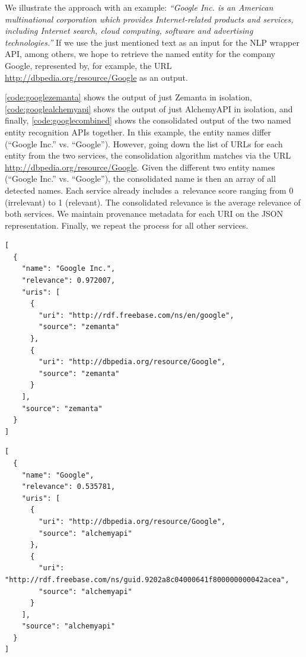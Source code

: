 We illustrate the approach with an example:
\textit{``Google Inc. is an American multinational corporation
which provides Internet-related products and services,
including Internet search, cloud computing, software and 
advertising technologies.''}
If we use the just mentioned text
as an input for the NLP wrapper API,
among others, we hope to retrieve the named entity for the
company Google, represented by, for example, the URL
\url{http://dbpedia.org/resource/Google} as an output.

\autoref{code:googlezemanta} shows the output
of just Zemanta in isolation,
\autoref{code:googlealchemyapi} shows the output
of just AlchemyAPI in isolation,
and finally, \autoref{code:googlecombined} shows the consolidated
output of the two named entity recognition APIs together. 
In this example, the entity names differ (``Google Inc.''
vs. ``Google''). However, going down the list of URLs for
each entity from the two services, the consolidation algorithm
matches via the URL \url{http://dbpedia.org/resource/Google}.
Given the different two entity names (``Google Inc.'' vs.
``Google''), the consolidated name is then an array of all
detected names.
Each service already includes a~relevance score ranging from
0 (irrelevant) to 1 (relevant).
The consolidated relevance is the
average relevance of both services.
We maintain provenance metadata for each URI
on the JSON representation.
Finally, we repeat the process for all other services.

\newpage

\begin{lstlisting}[caption={Output of Zemanta in isolation.},
  label={code:googlezemanta}]
[
  {
    "name": "Google Inc.",
    "relevance": 0.972007,
    "uris": [
      {
        "uri": "http://rdf.freebase.com/ns/en/google",
        "source": "zemanta"
      },
      {
        "uri": "http://dbpedia.org/resource/Google",
        "source": "zemanta"
      }
    ],
    "source": "zemanta"
  }
]
\end{lstlisting}

\begin{lstlisting}[caption={Output of AlchemyAPI in isolation.},
  label={code:googlealchemyapi}]
[
  {
    "name": "Google",
    "relevance": 0.535781,
    "uris": [
      {
        "uri": "http://dbpedia.org/resource/Google",
        "source": "alchemyapi"
      },
      {
        "uri": "http://rdf.freebase.com/ns/guid.9202a8c04000641f800000000042acea",
        "source": "alchemyapi"
      }
    ],
    "source": "alchemyapi"
  }
]
\end{lstlisting}

